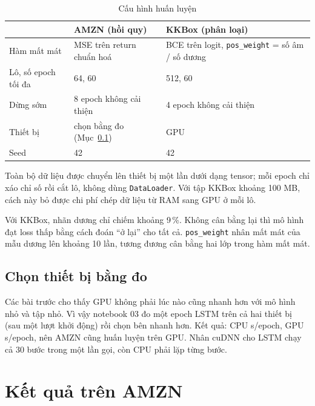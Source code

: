 \begin{table}[H]
  \centering\small
  \caption{Cấu hình huấn luyện}
  \label{tab:cfg}
  \begin{tabular}{lll}
    \toprule
    & AMZN (hồi quy) & KKBox (phân loại) \\
    \midrule
    Hàm mất mát & MSE trên return chuẩn hoá & BCE trên logit, \texttt{pos\_weight} = số âm / số dương \\
    Lô, số epoch tối đa & 64, 60 & 512, 60 \\
    Dừng sớm & 8 epoch không cải thiện & 4 epoch không cải thiện \\
    Thiết bị & chọn bằng đo (Mục~\ref{sec:thietbi}) & GPU \\
    Seed & 42 & 42 \\
    \bottomrule
  \end{tabular}
\end{table}

Toàn bộ dữ liệu được chuyển lên thiết bị một lần dưới dạng tensor; mỗi epoch chỉ xáo chỉ số rồi cắt lô, không dùng
\texttt{DataLoader}. Với tập KKBox khoảng 100 MB, cách này bỏ được chi phí chép dữ liệu từ RAM sang GPU ở mỗi lô.


Với KKBox, nhãn dương chỉ chiếm khoảng 9\,\%. Không cân bằng lại thì mô hình đạt loss thấp bằng cách đoán ``ở lại'' cho
tất cả. \texttt{pos\_weight} nhân mất mát của mẫu dương lên khoảng 10 lần, tương đương cân bằng hai lớp trong hàm mất mát.


\subsection{Chọn thiết bị bằng đo}
\label{sec:thietbi}

Các bài trước cho thấy GPU không phải lúc nào cũng nhanh hơn với mô hình nhỏ và tập nhỏ. Vì vậy notebook 03 đo một
epoch LSTM trên cả hai thiết bị (sau một lượt khởi động) rồi chọn bên nhanh hơn. Kết quả: CPU
 s/epoch, GPU  s/epoch, nên AMZN cũng huấn luyện trên GPU. Nhân cuDNN
cho LSTM chạy cả 30 bước trong một lần gọi, còn CPU phải lặp từng bước.


\section{Kết quả trên AMZN}

